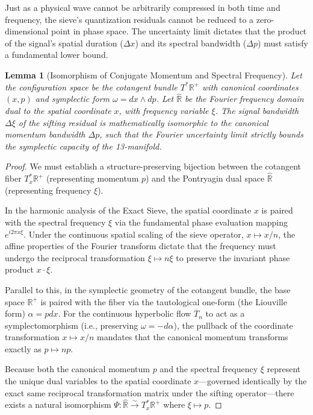 \documentclass[sn-mathphys-num, pdflatex, referee]{sn-jnl}
\newtheorem{lemma}{Lemma}
\begin{document}
Just as a physical wave cannot be arbitrarily compressed in both time and frequency, the sieve's quantization residuals cannot be reduced to a zero-dimensional point in phase space. The uncertainty limit dictates that the product of the signal's spatial duration ($\Delta x$) and its spectral bandwidth ($\Delta p$) must satisfy a fundamental lower bound.
\begin{lemma}[Isomorphism of Conjugate Momentum and Spectral Frequency]
\label{lemma:momentum_frequency_isomorphism}
Let the configuration space be the cotangent bundle $T^*\mathbb{R}^+$ with canonical coordinates $(x, p)$ and symplectic form $\omega = dx \wedge dp$. Let $\hat{\mathbb{R}}$ be the Fourier frequency domain dual to the spatial coordinate $x$, with frequency variable $\xi$. The signal bandwidth $\Delta \xi$ of the sifting residual is mathematically isomorphic to the canonical momentum bandwidth $\Delta p$, such that the Fourier uncertainty limit strictly bounds the symplectic capacity of the 13-manifold.
\end{lemma}

\begin{proof}
We must establish a structure-preserving bijection between the cotangent fiber $T_x^*\mathbb{R}^+$ (representing momentum $p$) and the Pontryagin dual space $\hat{\mathbb{R}}$ \cite{hewitt1979abstract} (representing frequency $\xi$). 

In the harmonic analysis of the Exact Sieve, the spatial coordinate $x$ is paired with the spectral frequency $\xi$ via the fundamental phase evaluation mapping $e^{i 2\pi x \xi}$. Under the continuous spatial scaling of the sieve operator, $x \mapsto x/n$, the affine properties of the Fourier transform dictate that the frequency must undergo the reciprocal transformation $\xi \mapsto n\xi$ to preserve the invariant phase product $x \cdot \xi$. 

Parallel to this, in the symplectic geometry of the cotangent bundle, the base space $\mathbb{R}^+$ is paired with the fiber via the tautological one-form (the Liouville form) $\alpha = p dx$. For the continuous hyperbolic flow $\overline{T}_n$ to act as a symplectomorphism (i.e., preserving $\omega = -d\alpha$), the pullback of the coordinate transformation $x \mapsto x/n$ mandates that the canonical momentum transforms exactly as $p \mapsto np$.

Because both the canonical momentum $p$ and the spectral frequency $\xi$ represent the unique dual variables to the spatial coordinate $x$—governed identically by the exact same reciprocal transformation matrix under the sifting operator—there exists a natural isomorphism $\Psi: \hat{\mathbb{R}} \xrightarrow{\sim} T_x^*\mathbb{R}^+$ where $\xi \mapsto p$.
\end{proof}
\end{document}
